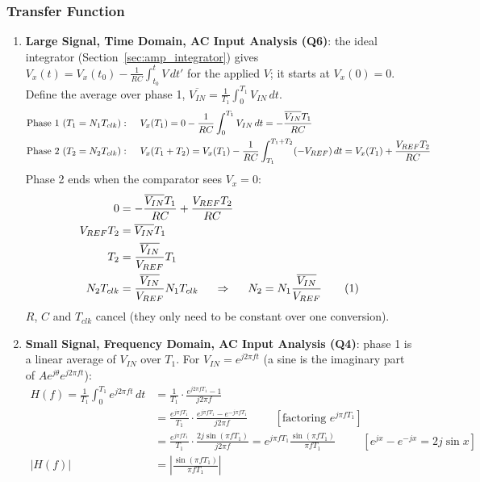 \subsubsection{Transfer Function}
\begin{enumerate}
  \item \textbf{Large Signal, Time Domain, AC Input Analysis (Q6)}: the ideal
integrator (Section~\ref{sec:amp_integrator}) gives
\(V_x(t) = V_x(t_0) - \frac{1}{RC}\int_{t_0}^{t} V\,dt'\) for the applied \(V\); it starts at \(V_x(0) = 0\).
Define the average over phase 1, \(\overline{V_{IN}} = \frac{1}{T_1}\int_0^{T_1} V_{IN}\, dt\).
\begin{align*}
  \text{Phase 1 } (T_1 = N_1 T_{clk}):& \hspace{0.5cm} V_x(T_1) = 0 - \frac{1}{RC}\int_0^{T_1} V_{IN}\, dt = -\frac{\overline{V_{IN}} T_1}{RC} \\
  \text{Phase 2 } (T_2 = N_2 T_{clk}):& \hspace{0.5cm} V_x(T_1 + T_2) = V_x(T_1) - \frac{1}{RC}\int_{T_1}^{T_1 + T_2} (-V_{REF})\, dt = V_x(T_1) + \frac{V_{REF} T_2}{RC}
\end{align*}
Phase 2 ends when the comparator sees \(V_x = 0\):
\begin{align*}
  0 &= -\frac{\overline{V_{IN}} T_1}{RC} + \frac{V_{REF} T_2}{RC} \\
  V_{REF} T_2 &= \overline{V_{IN}} T_1 \\
  T_2 &= \frac{\overline{V_{IN}}}{V_{REF}} T_1 \\
  N_2 T_{clk} &= \frac{\overline{V_{IN}}}{V_{REF}} N_1 T_{clk} \hspace{0.5cm} \Rightarrow \hspace{0.5cm}
  N_2 = N_1 \frac{\overline{V_{IN}}}{V_{REF}} \tag{1}
\end{align*}
\(R\), \(C\) and \(T_{clk}\) cancel (they only need to be constant over one conversion).
  \item \textbf{Small Signal, Frequency Domain, AC Input Analysis (Q4)}: phase 1 is a linear average
    of \(V_{IN}\) over \(T_1\). For
    \(V_{IN} = e^{j2\pi f t}\) (a sine is the imaginary part of
    \(A e^{j\theta} e^{j2\pi f t}\)):
    \begin{align*}
      H(f) = \frac{1}{T_1}\int_0^{T_1} e^{j2\pi f t}\, dt &= \frac{1}{T_1}\cdot\frac{e^{j2\pi f T_1} - 1}{j2\pi f} \\
      &= \frac{e^{j\pi f T_1}}{T_1}\cdot\frac{e^{j\pi f T_1} - e^{-j\pi f T_1}}{j2\pi f} \hspace{1cm} [\text{factoring } e^{j\pi f T_1}] \\
      &= \frac{e^{j\pi f T_1}}{T_1}\cdot\frac{2j\sin(\pi f T_1)}{j2\pi f} = e^{j\pi f T_1}\frac{\sin(\pi f T_1)}{\pi f T_1} \hspace{1cm} [e^{jx} - e^{-jx} = 2j\sin x] \\
      |H(f)| &= \left|\frac{\sin(\pi f T_1)}{\pi f T_1}\right| \tag{2}
    \end{align*}
\end{enumerate}

